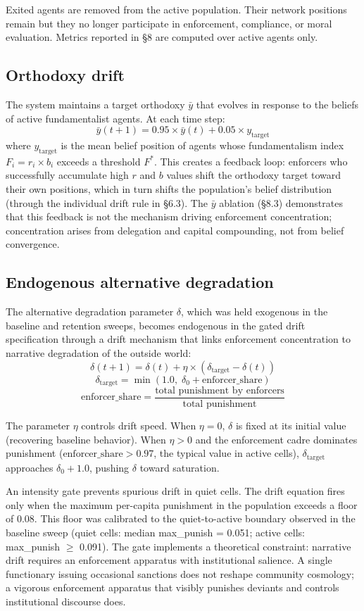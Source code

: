 \documentclass[12pt]{article}
\begin{document}
Exited agents are removed from the active population. Their network positions remain but they no longer participate in enforcement, compliance, or moral evaluation. Metrics reported in \S8 are computed over active agents only.

\subsection{Orthodoxy drift}

The system maintains a target orthodoxy $\bar{y}$ that evolves in response to the beliefs of active fundamentalist agents. At each time step:
\[
\bar{y}(t+1) = 0.95 \times \bar{y}(t) + 0.05 \times y_{\text{target}}
\]
where $y_{\text{target}}$ is the mean belief position of agents whose fundamentalism index $F_i = r_i \times b_i$ exceeds a threshold $F^*$. This creates a feedback loop: enforcers who successfully accumulate high $r$ and $b$ values shift the orthodoxy target toward their own positions, which in turn shifts the population's belief distribution (through the individual drift rule in \S6.3). The $\bar{y}$ ablation (\S8.3) demonstrates that this feedback is not the mechanism driving enforcement concentration; concentration arises from delegation and capital compounding, not from belief convergence.

\subsection{Endogenous alternative degradation}

The alternative degradation parameter $\delta$, which was held exogenous in the baseline and retention sweeps, becomes endogenous in the gated drift specification through a drift mechanism that links enforcement concentration to narrative degradation of the outside world:
\[
\delta(t+1) = \delta(t) + \eta \times (\delta_{\text{target}} - \delta(t))
\]
\[
\delta_{\text{target}} = \min(1.0,\; \delta_0 + \text{enforcer\_share})
\]
\[
\text{enforcer\_share} = \frac{\text{total punishment by enforcers}}{\text{total punishment}}
\]

The parameter $\eta$ controls drift speed. When $\eta = 0$, $\delta$ is fixed at its initial value (recovering baseline behavior). When $\eta > 0$ and the enforcement cadre dominates punishment ($\text{enforcer\_share} > 0.97$, the typical value in active cells), $\delta_{\text{target}}$ approaches $\delta_0 + 1.0$, pushing $\delta$ toward saturation.

An intensity gate prevents spurious drift in quiet cells. The drift equation fires only when the maximum per-capita punishment in the population exceeds a floor of 0.08. This floor was calibrated to the quiet-to-active boundary observed in the baseline sweep (quiet cells: median max\_punish = 0.051; active cells: max\_punish $\geq$ 0.091). The gate implements a theoretical constraint: narrative drift requires an enforcement apparatus with institutional salience. A single functionary issuing occasional sanctions does not reshape community cosmology; a vigorous enforcement apparatus that visibly punishes deviants and controls institutional discourse does.
\end{document}
